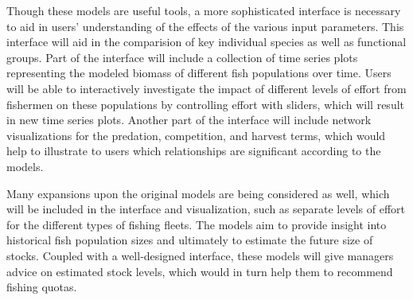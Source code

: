 \documentclass{article}
\begin{document}
Though these models are useful tools, a more sophisticated interface is necessary to aid in users' understanding of the effects of the various input parameters.  This interface will aid in the comparision of key individual species as well as functional groups.  Part of the interface will include a collection of time series plots representing the modeled biomass of different fish populations over time.  Users will be able to interactively investigate the impact of different levels of effort from fishermen on these populations by controlling effort with sliders, which will result in new time series plots.  Another part of the interface will include network visualizations for the predation, competition, and harvest terms, which would help to illustrate to users which relationships are significant according to the models.  

Many expansions upon the original models are being considered as well, which will be included in the interface and visualization, such as separate levels of effort for the different types of fishing fleets.  The models aim to provide insight into historical fish population sizes and ultimately to estimate the future size of stocks.  Coupled with a well-designed interface, these models will give managers advice on estimated stock levels, which would in turn help them to recommend fishing quotas.




\end{document}
